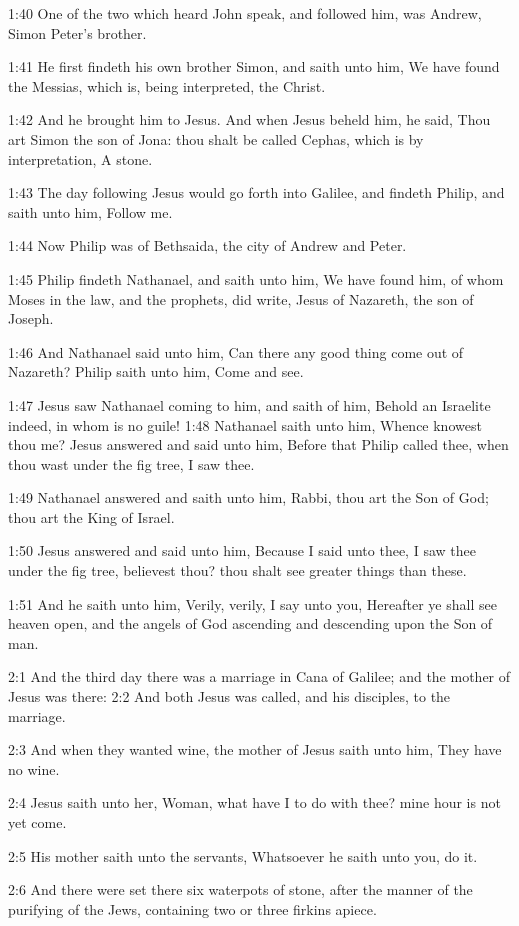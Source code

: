 1:40 One of the two which heard John speak, and followed him, was Andrew, Simon Peter's brother.

1:41 He first findeth his own brother Simon, and saith unto him, We have found the Messias, which is, being interpreted, the Christ.

1:42 And he brought him to Jesus. And when Jesus beheld him, he said, Thou art Simon the son of Jona: thou shalt be called Cephas, which is by interpretation, A stone.

1:43 The day following Jesus would go forth into Galilee, and findeth Philip, and saith unto him, Follow me.

1:44 Now Philip was of Bethsaida, the city of Andrew and Peter.

1:45 Philip findeth Nathanael, and saith unto him, We have found him, of whom Moses in the law, and the prophets, did write, Jesus of Nazareth, the son of Joseph.

1:46 And Nathanael said unto him, Can there any good thing come out of Nazareth? Philip saith unto him, Come and see.

1:47 Jesus saw Nathanael coming to him, and saith of him, Behold an Israelite indeed, in whom is no guile!  1:48 Nathanael saith unto him, Whence knowest thou me? Jesus answered and said unto him, Before that Philip called thee, when thou wast under the fig tree, I saw thee.

1:49 Nathanael answered and saith unto him, Rabbi, thou art the Son of God; thou art the King of Israel.

1:50 Jesus answered and said unto him, Because I said unto thee, I saw thee under the fig tree, believest thou? thou shalt see greater things than these.

1:51 And he saith unto him, Verily, verily, I say unto you, Hereafter ye shall see heaven open, and the angels of God ascending and descending upon the Son of man.

2:1 And the third day there was a marriage in Cana of Galilee; and the mother of Jesus was there: 2:2 And both Jesus was called, and his disciples, to the marriage.

2:3 And when they wanted wine, the mother of Jesus saith unto him, They have no wine.

2:4 Jesus saith unto her, Woman, what have I to do with thee? mine hour is not yet come.

2:5 His mother saith unto the servants, Whatsoever he saith unto you, do it.

2:6 And there were set there six waterpots of stone, after the manner of the purifying of the Jews, containing two or three firkins apiece.

